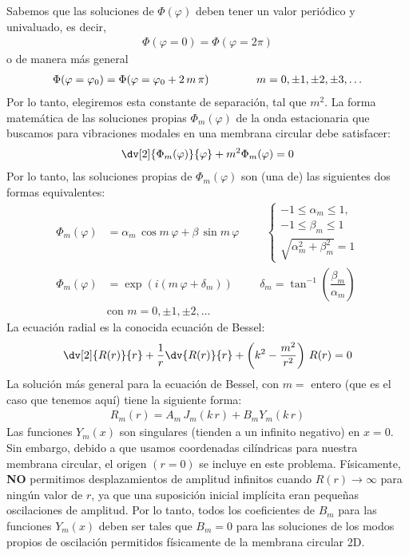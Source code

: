 \par
Sabemos que las soluciones de $\Phi (\varphi)$ deben tener un valor periódico y univaluado, es decir,
\begin{align*}
\Phi (\varphi = 0) = \Phi (\varphi = 2 \pi)
\end{align*}
o de manera más general
\begin{align*}
\Phi (\varphi = \varphi_{0}) = \Phi (\varphi = \varphi_{0} + 2 \, m \, \pi) \hspace{1.5cm} m = 0, \pm 1, \pm 2, \pm 3, \ldots
\end{align*}
Por lo tanto, elegiremos esta constante de separación, tal que $m^{2}$.
La forma matemática de las soluciones propias $\Phi_{m} (\varphi)$ de la onda estacionaria que buscamos para vibraciones modales en una membrana circular debe satisfacer:
\begin{align*}
\dv[2]{\Phi_{m}(\varphi)}{\varphi} + m^{2} \Phi_{m} (\varphi) = 0
\end{align*}
Por lo tanto, las soluciones propias de $\Phi_{m} (\varphi)$ son (una de) las siguientes dos formas equivalentes:
\begin{align*}
\Phi_{m} (\varphi) &= \alpha_{m} \, \cos m \, \varphi + \beta \, \sin m \, \varphi \hspace{1cm} \begin{cases}
-1 \leq \alpha_{m} \leq 1, \\
-1 \leq \beta_{m} \leq 1 \\
\sqrt{\alpha_{m}^{2} + \beta_{m}^{2}} = 1
\end{cases} \\[1em]
\Phi_{m} (\varphi) &= \exp(i (m \, \varphi + \delta_{m})) \hspace{1cm} \delta_{m} = \tan^{-1} \left( \dfrac{\beta_{m}}{\alpha_{m}}\right) \\[1em]
&\mbox{con } m = 0, \pm 1, \pm 2, \ldots
\end{align*}
La ecuación radial es la conocida ecuación de Bessel:
\begin{align*}
\dv[2]{R(r)}{r} + \dfrac{1}{r} \dv{R(r)}{r} + \left( k^{2} - \dfrac{m^{2}}{r^{2}} \right) \, R(r) = 0
\end{align*}
La solución más general para la ecuación de Bessel, con $m =$ entero (que es el caso que tenemos aquí) tiene la siguiente forma:
\begin{align*}
R_{m} (r) = A_{m} \, J_{m} (k \, r) + B_{m} Y_{m} (k \, r)
\end{align*}
Las funciones $Y_{m} (x)$ son singulares (tienden a un infinito negativo) en $x = 0$. Sin embargo, debido a que usamos coordenadas cilíndricas para nuestra membrana circular, el origen $(r = 0)$ se incluye en este problema. Físicamente, \textbf{NO} permitimos desplazamientos de amplitud infinitos cuando $R (r) \rightarrow \infty$ para ningún valor de $r$, ya que una suposición inicial implícita eran pequeñas oscilaciones de amplitud. Por lo tanto, todos los coeficientes de $B_{m}$ para las funciones $Y_{m} (x)$ deben ser tales que $B_{m} = 0$ para las soluciones de los modos propios de oscilación permitidos físicamente de la membrana circular 2D.
